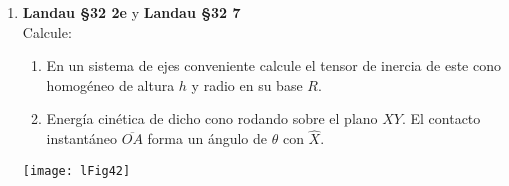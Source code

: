 \documentclass[11pt, spanish, a4paper, twoside]{article}
\begin{document}
\begin{enumerate}
		\item 
			\begin{minipage}[t][3.5cm]{0.5\textwidth}
				\textbf{Landau \S 32 2e} y \textbf{Landau \S 32 7}\\
				Calcule:
				\begin{enumerate}
					\item En un sistema de ejes conveniente calcule el tensor de inercia de este cono homogéneo de altura \(h\) y radio en su base \(R\).
					\item Energía cinética de dicho cono rodando sobre el plano \(X Y\).
						El contacto instantáneo \(\overline{O A}\) forma un ángulo de \(\theta\) con \(\hat{X}\).
				\end{enumerate}
			\end{minipage}
			\begin{minipage}[c][1cm][t]{0.45\textwidth}
				\texttt{[image: lFig42]}
			\end{minipage}


	\end{enumerate}
\end{document}
